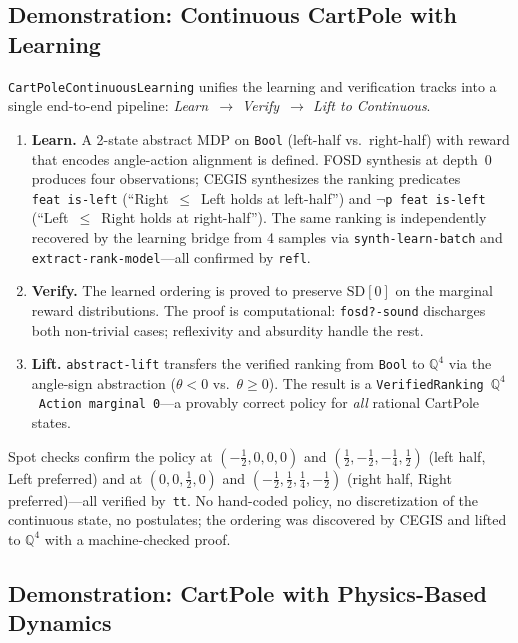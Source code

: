 \documentclass[9pt,a4paper]{article}
\theoremstyle{plain}
\theoremstyle{definition}
\theoremstyle{remark}
\begin{document}
\subsection{Demonstration: Continuous CartPole with Learning}

\texttt{CartPoleContinuousLearning} unifies the learning and verification tracks into a single end-to-end pipeline: \emph{Learn~$\to$ Verify~$\to$ Lift to Continuous}.

\begin{enumerate}
\item \textbf{Learn.} A 2-state abstract MDP on \texttt{Bool} (left-half vs.\ right-half) with reward that encodes angle-action alignment is defined.  FOSD synthesis at depth~0 produces four observations; CEGIS synthesizes the ranking predicates \texttt{feat~is-left} (``Right~$\le$~Left holds at left-half'') and \texttt{$\neg$p~feat~is-left} (``Left~$\le$~Right holds at right-half'').  The same ranking is independently recovered by the learning bridge from 4 samples via \texttt{synth-learn-batch} and \texttt{extract-rank-model}---all confirmed by \texttt{refl}.
\item \textbf{Verify.} The learned ordering is proved to preserve $\mathrm{SD}[0]$ on the marginal reward distributions.  The proof is computational: \texttt{fosd?-sound} discharges both non-trivial cases; reflexivity and absurdity handle the rest.
\item \textbf{Lift.} \texttt{abstract-lift} transfers the verified ranking from \texttt{Bool} to $\mathbb{Q}^4$ via the angle-sign abstraction ($\theta < 0$ vs.\ $\theta \ge 0$).  The result is a \texttt{VerifiedRanking}~$\mathbb{Q}^4$~\texttt{Action}~\texttt{marginal}~\texttt{0}---a provably correct policy for \emph{all} rational CartPole states.
\end{enumerate}

Spot checks confirm the policy at $(-\tfrac{1}{2},0,0,0)$ and $(\tfrac{1}{2},-\tfrac{1}{2},-\tfrac{1}{4},\tfrac{1}{2})$ (left half, Left preferred) and at $(0,0,\tfrac{1}{2},0)$ and $(-\tfrac{1}{2},\tfrac{1}{2},\tfrac{1}{4},-\tfrac{1}{2})$ (right half, Right preferred)---all verified by~\texttt{tt}.  No hand-coded policy, no discretization of the continuous state, no postulates; the ordering was discovered by CEGIS and lifted to $\mathbb{Q}^4$ with a machine-checked proof.

\subsection{Demonstration: CartPole with Physics-Based Dynamics}
\end{document}
